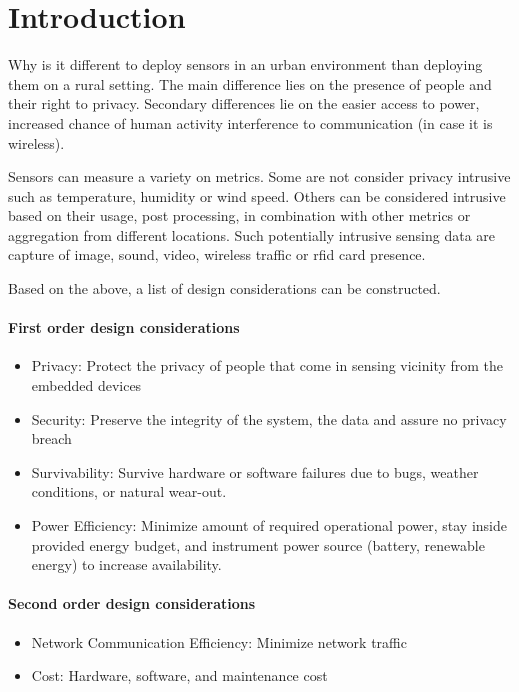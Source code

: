 \section{Introduction}

Why is it different to deploy sensors in an urban environment than deploying them on a rural setting. The main difference lies on the presence of people and their right to privacy. Secondary differences lie on the easier access to power, increased chance of human activity interference to communication (in case it is wireless).

Sensors can measure a variety on metrics. Some are not consider privacy intrusive such as temperature, humidity or wind speed. Others can be considered intrusive based on their usage, post processing, in combination with other metrics or aggregation from different locations. Such potentially intrusive sensing data are capture of image, sound, video, wireless traffic or rfid card presence.

Based on the above, a list of design considerations can be constructed.


\paragraph{First order design considerations}

\begin{itemize}
 \item Privacy: Protect the privacy of people that come in sensing vicinity from the embedded devices
 \item Security: Preserve the integrity of the system, the data and assure no privacy breach
 \item Survivability: Survive hardware or software failures due to bugs, weather conditions, or natural wear-out.
 \item Power Efficiency: Minimize amount of required operational power, stay inside provided energy budget, and instrument power source (battery, renewable energy) to increase availability.
\end{itemize}

\paragraph{Second order design considerations}

\begin{itemize}
 \item Network Communication Efficiency: Minimize network traffic 
 \item Cost: Hardware, software, and maintenance cost
\end{itemize}

